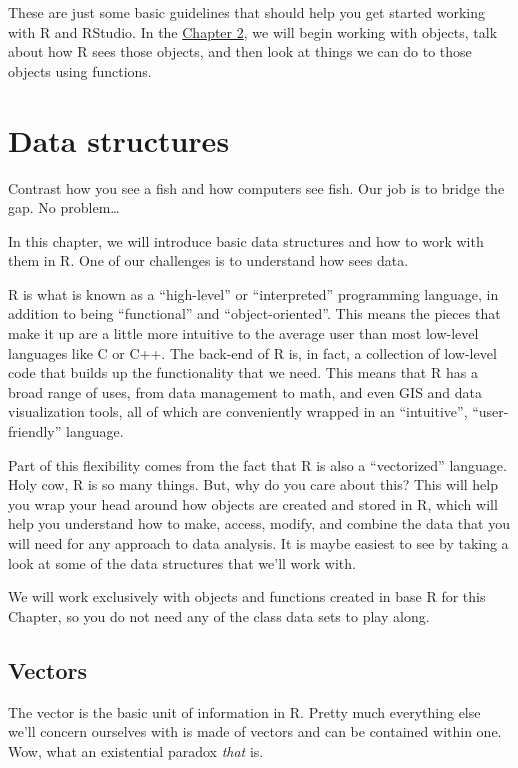 \documentclass[
]{book}
\begin{document}
These are just some basic guidelines that should help you get started working with R and RStudio. In the \protect\hyperlink{data_struc}{Chapter 2}, we will begin working with objects, talk about how R sees those objects, and then look at things we can do to those objects using functions.

\hypertarget{Chapter2}{%
\chapter{Data structures}\label{Chapter2}}

Contrast how you see a fish and how computers see fish. Our job is to bridge the gap. No problem\ldots{}

In this chapter, we will introduce basic data structures and how to work with them in R. One of our challenges is to understand how sees data.

R is what is known as a ``high-level'' or ``interpreted'' programming language, in addition to being ``functional'' and ``object-oriented''. This means the pieces that make it up are a little more intuitive to the average user than most low-level languages like C or C++. The back-end of R is, in fact, a collection of low-level code that builds up the functionality that we need. This means that R has a broad range of uses, from data management to math, and even GIS and data visualization tools, all of which are conveniently wrapped in an ``intuitive'', ``user-friendly'' language.

Part of this flexibility comes from the fact that R is also a ``vectorized'' language. Holy cow, R is so many things. But, why do you care about this? This will help you wrap your head around how objects are created and stored in R, which will help you understand how to make, access, modify, and combine the data that you will need for any approach to data analysis. It is maybe easiest to see by taking a look at some of the data structures that we'll work with.

We will work exclusively with objects and functions created in base R for this Chapter, so you do not need any of the class data sets to play along.

\hypertarget{vectors}{%
\section{Vectors}\label{vectors}}

The vector is the basic unit of information in R. Pretty much everything else we'll concern ourselves with is made of vectors and can be contained within one. Wow, what an existential paradox \emph{that} is.
\end{document}

